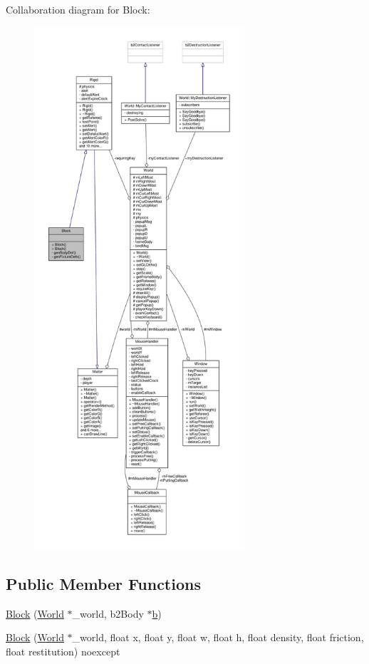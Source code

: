Collaboration diagram for Block\+:
\nopagebreak
\begin{figure}[H]
\begin{center}
\leavevmode
\includegraphics[height=550pt]{classBlock__coll__graph}
\end{center}
\end{figure}
\subsection*{Public Member Functions}
\begin{DoxyCompactItemize}
\item 
\hyperlink{classBlock_aae3e29e7e018dd11531c7ac7acbcc4b6}{Block} (\hyperlink{classWorld}{World} $\ast$\+\_\+world, b2\+Body $\ast$\hyperlink{image_8h_ab2d05693952610f937e5acb3c4a8fa1b}{b})
\item 
\hyperlink{classBlock_a2a61e69a3b1e77cb87fbd00da334b030}{Block} (\hyperlink{classWorld}{World} $\ast$\+\_\+world, float x, float y, float w, float h, float density, float friction, float restitution) noexcept
\end{DoxyCompactItemize}
